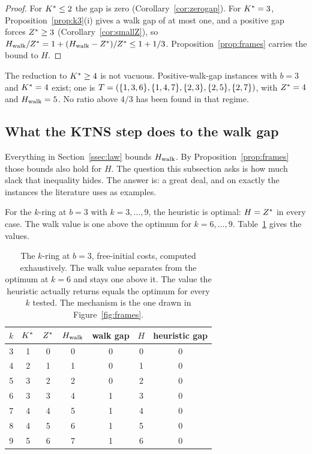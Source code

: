 \begin{proof}
For $K^{\ast}\le2$ the gap is zero (Corollary~\ref{cor:zerogap}). For $K^{\ast}=3$,
Proposition~\ref{prop:k3}(i) gives a walk gap of at most one, and a positive gap
forces $Z^{\ast}\ge3$ (Corollary~\ref{cor:smallZ}), so
$H_{\mathrm{walk}}/Z^{\ast}=1+(H_{\mathrm{walk}}-Z^{\ast})/Z^{\ast}\le1+1/3$. Proposition~\ref{prop:frames} carries the
bound to $H$.
\end{proof}

The reduction to $K^{\ast}\ge4$ is not vacuous. Positive-walk-gap instances with $b=3$
and $K^{\ast}=4$ exist; one is
$T=(\{1,3,6\},\{1,4,7\},\{2,3\},\{2,5\},\{2,7\})$, with $Z^{\ast}=4$ and
$H_{\mathrm{walk}}=5$. No ratio above $4/3$ has been found in that regime.

\subsection{What the KTNS step does to the walk gap}\label{ssec:ktnsgap}

Everything in Section~\ref{ssec:law} bounds $H_{\mathrm{walk}}$. By
Proposition~\ref{prop:frames} those bounds also hold for $H$. The question this
subsection asks is how much slack that inequality hides. The answer is: a great deal,
and on exactly the instances the literature uses as examples.

\begin{observation}\label{obs:rings}
For the $k$-ring at $b=3$ with $k=3,\dots,9$, the heuristic is optimal:
$H=Z^{\ast}$ in every case. The walk value is one above the optimum for
$k=6,\dots,9$. Table~\ref{tab:rings} gives the values.
\end{observation}

\begin{table}[h]\centering
\begin{tabular}{ccccccc}
\toprule
$k$ & $K^{\ast}$ & $Z^{\ast}$ & $H_{\mathrm{walk}}$ & walk gap & $H$ & heuristic gap\\
\midrule
3 & 1 & 0 & 0 & 0 & 0 & 0\\
4 & 2 & 1 & 1 & 0 & 1 & 0\\
5 & 3 & 2 & 2 & 0 & 2 & 0\\
6 & 3 & 3 & 4 & 1 & 3 & 0\\
7 & 4 & 4 & 5 & 1 & 4 & 0\\
8 & 4 & 5 & 6 & 1 & 5 & 0\\
9 & 5 & 6 & 7 & 1 & 6 & 0\\
\bottomrule
\end{tabular}
\caption{The $k$-ring at $b=3$, free-initial costs, computed exhaustively. The walk
value separates from the optimum at $k=6$ and stays one above it. The value the
heuristic actually returns equals the optimum for every $k$ tested. The mechanism is
the one drawn in Figure~\ref{fig:frames}.}\label{tab:rings}
\end{table}

